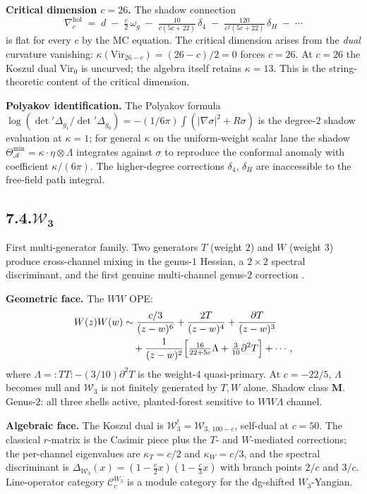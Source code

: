 \documentclass[11pt,reqno]{amsart}
\theoremstyle{definition}
\theoremstyle{remark}
\providecommand{\cA}{\mathcal{A}}
\providecommand{\cC}{\mathcal{C}}
\providecommand{\cW}{\mathcal{W}}
\providecommand{\Vir}{\mathrm{Vir}}
\providecommand{\hol}{\mathrm{hol}}
\numberwithin{equation}{section}
\begin{document}
\medskip\noindent\textbf{Critical dimension $c = 26$.} The
shadow connection
\[
\nabla^{\hol}_c
\;=\;
d \;-\; \tfrac{c}{2}\,\omega_g
\;-\; \tfrac{10}{c(5c+22)}\,\delta_4
\;-\; \tfrac{120}{c^2(5c+22)}\,\delta_H
\;-\; \cdots
\]
is flat for every $c$ by the MC equation. The critical
dimension arises from the \emph{dual} curvature vanishing:
$\kappa(\Vir_{26-c}) = (26-c)/2 = 0$ forces $c = 26$. At
$c = 26$ the Koszul dual $\Vir_0$ is uncurved; the algebra
itself retains $\kappa = 13$. This is the string-theoretic
content of the critical dimension.

\medskip\noindent\textbf{Polyakov identification.} The
Polyakov formula $\log(\det'\Delta_{g_1}/\det'\Delta_{g_0})
= -(1/6\pi)\int(|\nabla\sigma|^2 + R\sigma)$ is the degree-$2$
shadow evaluation at $\kappa = 1$; for general $\kappa$ on
the uniform-weight scalar lane the shadow
$\Theta^{\min}_\cA = \kappa\cdot\eta\otimes\Lambda$ integrates
against $\sigma$ to reproduce the conformal anomaly with
coefficient $\kappa/(6\pi)$. The higher-degree corrections
$\delta_4$, $\delta_H$ are inaccessible to the free-field path
integral.

\subsection*{7.4.\quad $\boldsymbol{\cW_3}$}

First multi-generator family. Two generators $T$ (weight $2$)
and $W$ (weight $3$) produce cross-channel mixing in the
genus-$1$ Hessian, a $2 \times 2$ spectral discriminant, and
the first genuine multi-channel genus-$2$ correction .

\medskip\noindent\textbf{Geometric face.} The $WW$ OPE:
\begin{align*}
W(z) W(w)
&\sim \frac{c/3}{(z-w)^6}
+ \frac{2T}{(z-w)^4}
+ \frac{\partial T}{(z-w)^3}\\
&\quad + \frac{1}{(z-w)^2}\Bigl[\tfrac{16}{22+5c}\Lambda
+ \tfrac{3}{10}\partial^2 T\Bigr] + \cdots,
\end{align*}
where $\Lambda = :TT: - (3/10)\partial^2 T$ is the
weight-$4$ quasi-primary. At $c = -22/5$, $\Lambda$ becomes
null and $\cW_3$ is not finitely generated by $T, W$ alone.
Shadow class $\mathbf M$. Genus-$2$: all three shells
active, planted-forest sensitive to $WW\Lambda$ channel.

\medskip\noindent\textbf{Algebraic face.} The Koszul dual is
$\cW_3^! = \cW_{3,\,100-c}$, self-dual at $c = 50$. The
classical $r$-matrix is the Casimir piece plus the $T$-
and $W$-mediated corrections; the per-channel eigenvalues
are $\kappa_T = c/2$ and $\kappa_W = c/3$, and the
spectral discriminant is
$\Delta_{\cW_3}(x) = (1 - \tfrac{c}{2}x)(1 - \tfrac{c}{3}x)$
with branch points $2/c$ and $3/c$. Line-operator category
$\cC_c^{W_3}$ is a module category for the dg-shifted
$W_3$-Yangian.
\end{document}
